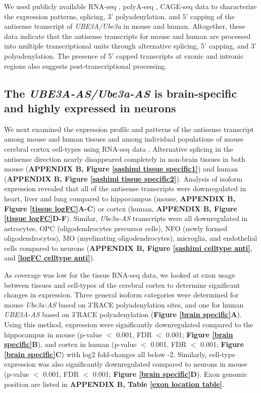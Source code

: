 We used publicly available RNA-seq \cite{Lin2016,Pervouchine2015}, polyA-seq \cite{Derti2012}, CAGE-seq \cite{Lizio2015} data to characterize the expression patterns, splicing, 3' polyadenylation, and 5' capping of the antisense transcript of \textit{UBE3A/Ube3a} in mouse and human. Altogether, these data indicate that the antisense transcripts for mouse and human are processed into multiple transcriptional units through alternative splicing, 5' capping, and 3' polyadenylation. The presence of 5' capped transcripts at exonic and intronic regions also suggests post-transcriptional processing.

\subsection{The \emph{UBE3A-AS/Ube3a-AS} is brain-specific and highly expressed in neurons}

We next examined the expression profile and patterns of the antisense transcript among mouse and human tissues and among individual populations of mouse cerebral cortex cell-types using RNA-seq data \cite{Uhlen2015,Zhang2014}. Alternative splicing in the antisense direction nearly disappeared completely in non-brain tissues in both mouse (\textbf{APPENDIX B, Figure \ref{sashimi tissue specific1}}) and human (\textbf{APPENDIX B, Figure \ref{sashimi tissue specific2}}). Analysis of isoform expression revealed that all of the antisense transcripts were downregulated in heart, liver and lung compared to hippocampus (mouse, \textbf{APPENDIX B, Figure \ref{tissue logFC}A-C}) or cortex (human, \textbf{APPENDIX B, Figure \ref{tissue logFC}D-F}). Similar, \textit{Ube3a-AS} transcripts were all downregulated in astrocytes, OPC (oligodendrocytes precursor cells), NFO (newly formed oligodendrocytes), MO (myelinating oligodendrocytes), microglia, and endothelial cells compared to neurons (\textbf{APPENDIX B, Figure \ref{sashimi celltype anti}}, and \textbf{\ref{logFC celltype anti}}).

As coverage was low for the tissue RNA-seq data, we looked at exon usage between tissues and cell-types of the cerebral cortex to determine significant changes in expression. Three general isoform categories were determined for mouse \textit{Ube3a-AS} based on 3'RACE polyadenylation sites, and one for human \textit{UBE3A-AS} based on 3'RACE polyadenylation (\textbf{Figure \ref{brain specific}A}). Using this method, expression were significantly downregulated compared to the hippocampus in mouse (p-value $<$ 0.001, FDR $<$ 0.001; \textbf{Figure \ref{brain specific}B}), and cortex in human (p-value $<$ 0.001, FDR $<$ 0.001; \textbf{Figure \ref{brain specific}C}) with log2 fold-changes all below -2. Similarly, cell-type expression was also significantly downregulated compared to neurons in mouse (p-value $<$ 0.001, FDR $<$ 0.001; \textbf{Figure \ref{brain specific}D}). Exon genomic position are listed in \textbf{APPENDIX B, Table \ref{exon location table}}.


